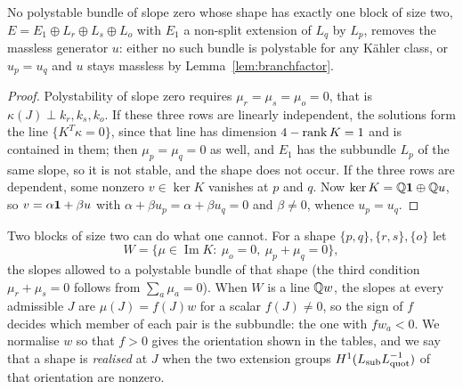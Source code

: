 \begin{proposition}\label{prop:oneblock}
No polystable bundle of slope zero whose shape has exactly one block of
size two, $E=E_1\oplus L_r\oplus L_s\oplus L_o$ with $E_1$ a non-split
extension of $L_q$ by $L_p$, removes the massless generator $u$: either no
such bundle is polystable for any K\"ahler class, or $u_p=u_q$ and $u$
stays massless by Lemma~\ref{lem:branchfactor}.
\end{proposition}
\begin{proof}
Polystability of slope zero requires $\mu_r=\mu_s=\mu_o=0$, that is
$\kappa(J)\perp k_r,k_s,k_o$. If these three rows are linearly
independent, the solutions form the line $\{K^T\kappa=0\}$, since that
line has dimension $4-\operatorname{rank} K=1$ and is contained in them; then
$\mu_p=\mu_q=0$ as well, and $E_1$ has the subbundle $L_p$ of the same
slope, so it is not stable, and the shape does not occur. If the three rows
are dependent, some nonzero $v\in\ker K$ vanishes at $p$ and $q$. Now
$\ker K=\mathbb{Q}\mathbf{1}\oplus\mathbb{Q} u$, so $v=\alpha\mathbf{1}+\beta u$ with
$\alpha+\beta u_p=\alpha+\beta u_q=0$ and $\beta\ne0$, whence $u_p=u_q$.
\end{proof}

Two blocks of size two can do what one cannot. For a shape
$\{p,q\},\{r,s\},\{o\}$ let
\[
 W=\{\mu\in\operatorname{Im}K:\ \mu_o=0,\ \mu_p+\mu_q=0\},
\]
the slopes allowed to a polystable bundle of that shape (the third
condition $\mu_r+\mu_s=0$ follows from $\sum_a\mu_a=0$). When $W$ is a
line $\mathbb{Q} w$, the slopes at every admissible $J$ are $\mu(J)=f(J)w$ for a
scalar $f(J)\ne0$, so the sign of $f$ decides which member of each pair
is the subbundle: the one with $fw_a<0$. We normalise $w$ so that $f>0$
gives the orientation shown in the tables, and we say that a shape is
\emph{realised} at $J$ when the two extension groups
$H^1(L_{\rm sub}L_{\rm quot}^{-1})$ of that orientation are nonzero.

